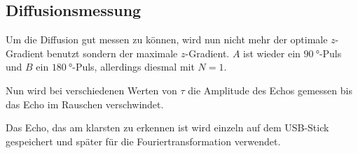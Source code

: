 \subsection{Diffusionsmessung}
\label{ssec:Diffusionsmessung}

Um die Diffusion gut messen zu können, wird nun nicht mehr der optimale $z$-Gradient benutzt sondern der maximale $z$-Gradient.
$A$ ist wieder ein $\SI{90}{\degree}$-Puls und $B$ ein $\SI{180}{\degree}$-Puls, allerdings diesmal mit $N=1$.

Nun wird bei verschiedenen Werten von $\tau$ die Amplitude des Echos gemessen bis das Echo im Rauschen verschwindet.

Das Echo, das am klarsten zu erkennen ist wird einzeln auf dem USB-Stick gespeichert und später für die Fouriertransformation verwendet.
